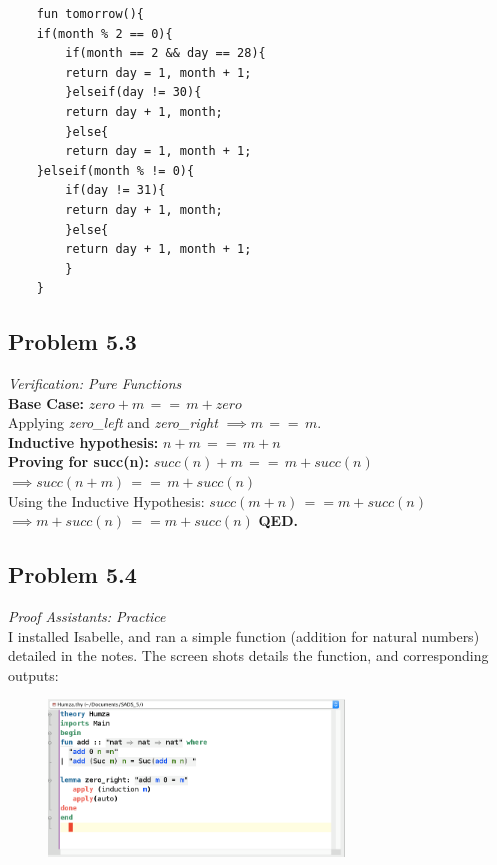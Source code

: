 \documentclass[a4paper]{article}
\begin{document}
	\pagebreak
		
	\begin{verbatim}
	fun tomorrow(){
	if(month % 2 == 0){
		if(month == 2 && day == 28){
		return day = 1, month + 1;
		}elseif(day != 30){
		return day + 1, month;
		}else{
		return day = 1, month + 1;
	}elseif(month % != 0){
		if(day != 31){
		return day + 1, month;
		}else{
		return day + 1, month + 1;
		}
	}
	\end{verbatim}	
	
	\subsection*{Problem 5.3} \textit{Verification: Pure Functions} \\
	
	\textbf{Base Case:} $zero + m \, == \, m + zero$ \\
	Applying \textit{zero\_left} and \textit{zero\_right} $\implies m \, == \,m$. \\
	\textbf{Inductive hypothesis:} $n + m\, ==\, m + n$ \\
	\textbf{Proving for succ(n):} $succ(n) + m \, == \, m + succ(n)$
	$\implies succ(n+m) \, == \, m+ succ(n)$ \\
	Using the Inductive Hypothesis: $succ(m+n) \, == m+ succ(n)$
	$\implies m+ succ(n) \, == m+ succ(n) $ \textbf{QED.}
	
	\subsection*{Problem 5.4} \textit{Proof Assistants: Practice} \\
	
	I installed Isabelle, and ran a simple function (addition for natural numbers) detailed in the notes. The screen shots details the function, and corresponding outputs:
	
	\begin{figure}[ht]
		\centering
		\includegraphics[width=0.7\textwidth, scale=0.7]{1.png}
		\caption*{}
		\label{1}
	\end{figure}
	
\end{document}
